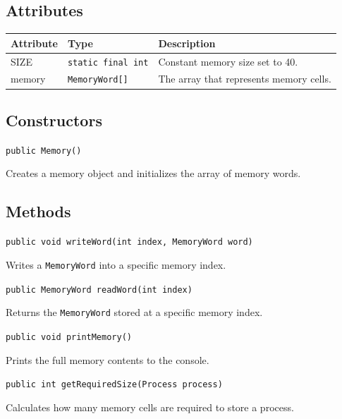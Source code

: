 \documentclass[12pt,a4paper]{article}
\begin{document}
\subsection{Attributes}

\begin{tabularx}{\textwidth}{p{4cm} p{3cm} Y}
\toprule
\textbf{Attribute} & \textbf{Type} & \textbf{Description} \\
\midrule
SIZE & \texttt{static final int} & Constant memory size set to 40. \\
memory & \texttt{MemoryWord[]} & The array that represents memory cells. \\
\bottomrule
\end{tabularx}

\subsection{Constructors}

\begin{signaturebox}
\texttt{public Memory()}
\end{signaturebox}

Creates a memory object and initializes the array of memory words.

\subsection{Methods}

\begin{signaturebox}
\texttt{public void writeWord(int index, MemoryWord word)}
\end{signaturebox}
Writes a \texttt{MemoryWord} into a specific memory index.

\begin{signaturebox}
\texttt{public MemoryWord readWord(int index)}
\end{signaturebox}
Returns the \texttt{MemoryWord} stored at a specific memory index.

\begin{signaturebox}
\texttt{public void printMemory()}
\end{signaturebox}
Prints the full memory contents to the console.

\begin{signaturebox}
\texttt{public int getRequiredSize(Process process)}
\end{signaturebox}
Calculates how many memory cells are required to store a process.
\end{document}
